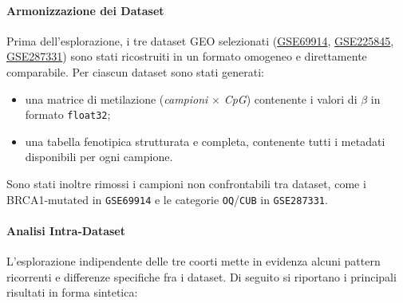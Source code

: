 \documentclass[10pt]{extarticle}
\begin{document}
\paragraph{Armonizzazione dei Dataset}
Prima dell’esplorazione, i tre dataset GEO selezionati 
(\href{https://www.ncbi.nlm.nih.gov/geo/query/acc.cgi?acc=GSE69914}{GSE69914}, 
\href{https://www.ncbi.nlm.nih.gov/geo/query/acc.cgi?acc=GSE225845}{GSE225845},
\href{https://www.ncbi.nlm.nih.gov/geo/query/acc.cgi?acc=GSE287331}{GSE287331}) 
sono stati ricostruiti in un formato omogeneo e direttamente comparabile. Per ciascun dataset sono stati generati:

\begin{itemize}[label=-]
    \item una matrice di metilazione (\textit{campioni} $\times$ \textit{CpG}) contenente i valori di $\beta$ in formato \texttt{float32};
    \item una tabella fenotipica strutturata e completa, contenente tutti i metadati disponibili per ogni campione.
\end{itemize}

Sono stati inoltre rimossi i campioni non confrontabili tra dataset, come i BRCA1-mutated in \texttt{GSE69914} e le categorie
\texttt{OQ}/\texttt{CUB} in \texttt{GSE287331}.  

\paragraph{Analisi Intra-Dataset}
L’esplorazione indipendente delle tre coorti mette in evidenza alcuni pattern ricorrenti e differenze specifiche fra i dataset.
Di seguito si riportano i principali risultati in forma sintetica:
\end{document}
